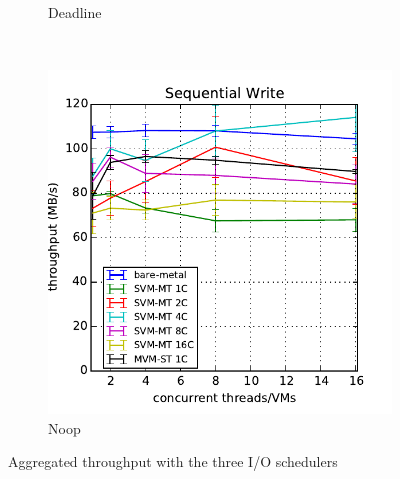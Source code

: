 \documentclass{acmsig}
\begin{document}
\begin{figure}[t]
\begin{subfigure}[b]{0.3\textwidth}
     \caption{Deadline}
     \label{fig:aggthroughput_deadline_write}
   \end{subfigure}
    ~ %
   \begin{subfigure}[b]{0.3\textwidth}
     \includegraphics[width=\textwidth]{figures/throughput_noop_write.pdf}
     \caption{Noop}
     \label{fig:aggthroughput_noop_write}
   \end{subfigure}
   \caption{Aggregated throughput with the three I/O schedulers}\label{fig:aggthroughput}
\end{figure}
\end{document}
